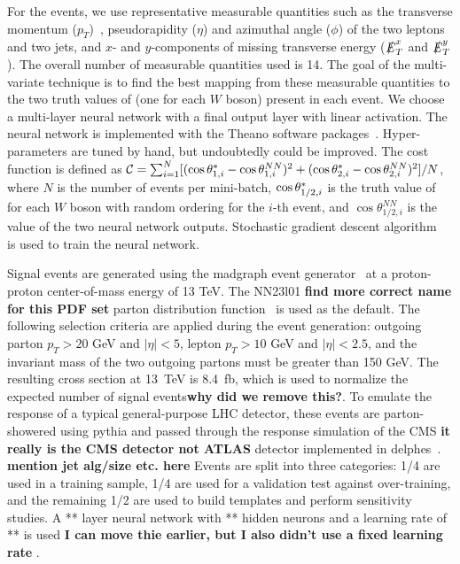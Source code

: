 For the \ssWW events, we use representative measurable quantities such
as the transverse momentum ($p_T$)~\cite{coordinate}, pseudorapidity ($\eta$) and
azimuthal angle ($\phi$) of the two leptons and two jets, and $x$- and $y$-components 
of missing transverse energy ($\slashed{E}_T^x$ and
$\slashed{E}_T^y$).  The overall number of measurable quantities used is 14. 
The goal of the multi-variate technique is to find
the best mapping from these measurable quantities to the two truth
values of \cts (one for each $W$ boson) present in each event.  We
choose a multi-layer neural network with a final output layer with
linear activation. The neural network is implemented with the Theano
software packages~\cite{theano}. Hyper-parameters are tuned by hand,
but undoubtedly could be improved.  The cost function is defined as 
${\cal{C}}= \sum_{i=1}^{N} [(\ctsnb_{1,i} -\cos \theta^{NN}_{1,i})^2+(\ctsnb_{2,i}-\cos \theta^{NN}_{2,i})^2]/N$, 
where $N$ is the number of events per mini-batch,
$ \cos  \theta^{*}  _{1/2,i}$ is the truth value of \cts for each $W$ boson with
random ordering for the $i$-th event, and $\cos \theta^{NN}_{1/2, i}$ is the value of
the two neural network outputs. Stochastic gradient descent
algorithm~\cite{sgd} is used to train the neural network.

Signal \ssWW events are generated using the {\sc madgraph} event generator~\cite{madgraph} at a proton-proton center-of-mass energy of 13 TeV.  
The NN23l01 {\bf find more correct name for this PDF set} parton distribution function~\cite{pdf} is used as the default. 
The following selection criteria are applied during the event generation: outgoing parton $p_T > 20$ GeV and $|\eta| < 5$, 
lepton $p_T > 10$ GeV and $|\eta| < 2.5$, and the invariant mass of the two outgoing partons must be greater than 150 GeV. The resulting cross section at 13~TeV is 8.4~fb, which is used to normalize the expected number of signal events{\bf why did we remove this?}.
To emulate the response of a typical general-purpose LHC detector, these events are parton-showered using {\sc pythia}\cite{pythia} and passed through the 
response simulation of the CMS {\bf it really is the CMS detector not ATLAS} detector implemented in {\sc delphes}~\cite{delphes}. {\bf mention jet alg/size etc. here} Events
are split into three categories: 1/4 are used in a training sample,
1/4 are used for a validation test against over-training, and the
remaining 1/2 are used to build templates and perform sensitivity
studies. A ** layer neural network with ** hidden neurons and a
learning rate of ** is used {\bf I can move thie earlier, but I also didn't use a fixed learning rate }.

